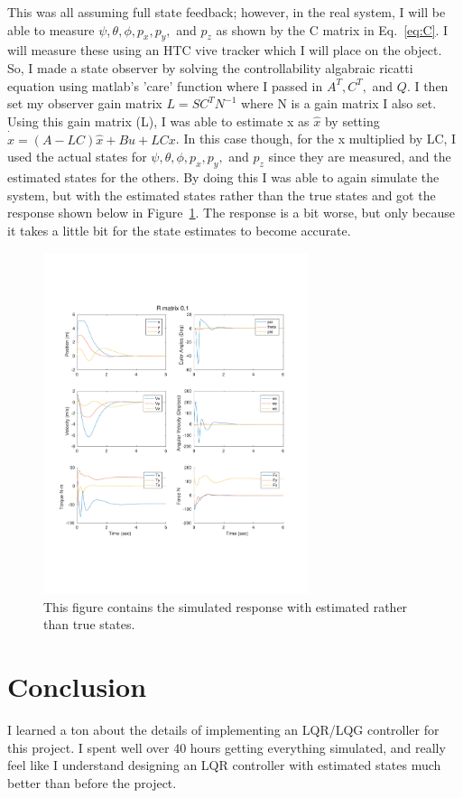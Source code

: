\documentclass{article}
\begin{document}
This was all assuming full state feedback; however, in the real system, I will be able to measure $\psi, \theta, \phi, p_x, p_y,$ and $p_z$ as shown by the C matrix in Eq.~\ref{eq:C}. I will measure these using an HTC vive tracker which I will place on the object. So, I made a state observer by solving the controllability algabraic ricatti equation using matlab's 'care' function where I passed in $A^T, C^T,$ and $Q$. I then set my observer gain matrix $L = S C^T N^{-1}$ where N is a gain matrix I also set. Using this gain matrix (L), I was able to estimate x as $\hat{x}$ by setting $\dot{\hat{x}} = (A-LC)\hat{x} + Bu + LCx$. In this case though, for the x multiplied by LC, I used the actual states for $\psi, \theta, \phi, p_x, p_y,$ and $p_z$ since they are measured, and the estimated states for the others. By doing this I was able to again simulate the system, but with the estimated states rather than the true states and got the response shown below in Figure~\ref{fig:est_states}. The response is a bit worse, but only because it takes a little bit for the state estimates to become accurate.

\begin{figure}[H]
    \centering
        \includegraphics[clip, trim=1cm 4.5cm 1.5cm 4cm, width=0.69\textwidth]{R_0_1_plot_estimated_states.pdf}
    \caption{This figure contains the simulated response with estimated rather than true states.}
    \label{fig:est_states}
\end{figure}

\section{Conclusion}
I learned a ton about the details of implementing an LQR/LQG controller for this project. I spent well over 40 hours getting everything simulated, and really feel like I understand designing an LQR controller with estimated states much better than before the project. 
\end{document}
